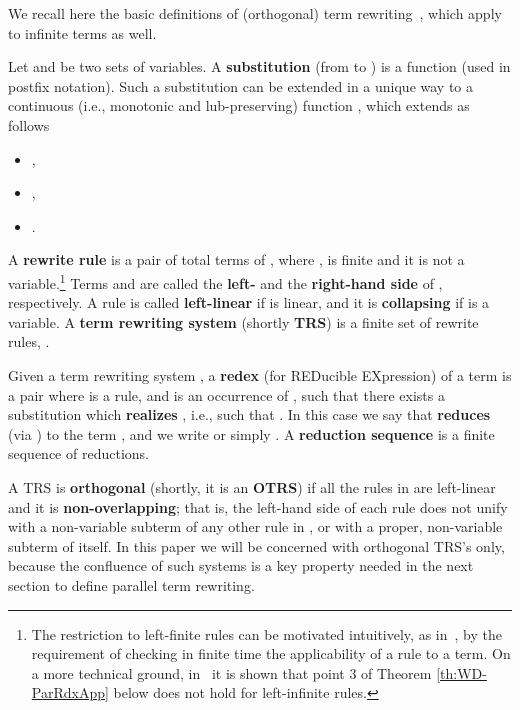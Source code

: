 \documentclass{eptcs}
\theoremstyle{plain}
\theoremstyle{definition}
\begin{document}
We recall here the basic definitions of (orthogonal) term rewriting~\cite{HL:CORS1},  
which apply to infinite terms as well.

Let  and  be
two sets of variables. A {\bf substitution} (from  to ) is
a function  (used in postfix 
notation). 
Such a substitution  can be extended in a unique way to
a continuous (i.e., monotonic and lub-preserving) function , which extends  as 
follows

\begin{itemize}

\item ,

\item ,

\item .
\end{itemize}
  



\noindent
A {\bf rewrite rule}  is a pair of total terms of 
,
where ,  is finite and it is not a 
variable.\footnote{The restriction to left-finite rules can be 
motivated 
intuitively, as in~\cite{KKSV:AGRS}, by the requirement of checking in 
finite 
time the applicability of a rule to a term. On a more technical 
ground, in~\cite{Cor:TRC} it is shown that point 3 of Theorem \ref{th:WD-ParRdxApp}
below does not hold for left-infinite rules.}
Terms  and
 are called the {\bf left-} and the {\bf right-hand side} of , 
respectively. 
A rule is called {\bf left-linear} if   is linear, and it is {\bf 
collapsing} if  is a variable. 
A {\bf term rewriting 
system} (shortly {\bf TRS})
 is a finite set of rewrite rules, .

Given a term rewriting system
, a {\bf redex} (for REDucible EXpression)   of a 
term 
  is a pair 
 where  is a rule,  and
 is an occurrence of , such that there exists a substitution 
 which {\bf realizes} , i.e., 
such that . In this case we say that  {\bf reduces} 
(via ) to 
the 
term , and we write   or simply . 
A {\bf reduction sequence}  is a finite sequence of reductions. 

A TRS  is {\bf orthogonal} (shortly, it is an {\bf OTRS}) 
if all the rules in  are 
left-linear and it is {\bf non-overlapping}; that is, the 
left-hand 
side of each rule does not unify with a non-variable subterm 
of 
any other rule in , or with a proper, non-variable subterm
of itself. In this paper we will be concerned  
with orthogonal TRS's only, because the confluence of such 
systems is a key property needed in the next section to 
define    parallel term rewriting.
\end{document}
